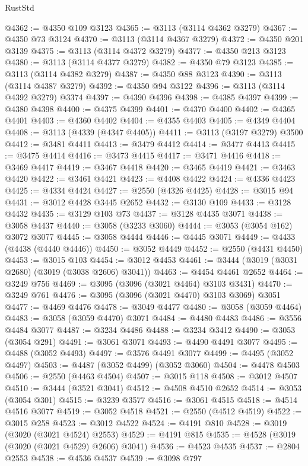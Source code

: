 \begin{lexlean}{RustStd}
\begin{coremodule}
@4362 := @4350 @109 @3123
@4365 := @3113 (@3114 @4362 @3279)
@4367 := @4350 @73 @3124
@4370 := @3113 (@3114 @4367 @3279)
@4372 := @4350 @201 @3139
@4375 := @3113 (@3114 @4372 @3279)
@4377 := @4350 @213 @3123
@4380 := @3113 (@3114 @4377 @3279)
@4382 := @4350 @79 @3123
@4385 := @3113 (@3114 @4382 @3279)
@4387 := @4350 @88 @3123
@4390 := @3113 (@3114 @4387 @3279)
@4392 := @4350 @94 @3122
@4396 := @3113 (@3114 @4392 @3279) @3374
@4397 := @4390 @4396
@4398 := @4385 @4397
@4399 := @4380 @4398
@4400 := @4375 @4399
@4401 := @4370 @4400
@4402 := @4365 @4401
@4403 := @4360 @4402
@4404 := @4355 @4403
@4405 := @4349 @4404
@4408 := @3113 (@4339 (@4347 @4405))
@4411 := @3113 (@3197 @3279) @3500
@4412 := @3481 @4411
@4413 := @3479 @4412
@4414 := @3477 @4413
@4415 := @3475 @4414
@4416 := @3473 @4415
@4417 := @3471 @4416
@4418 := @3469 @4417
@4419 := @3467 @4418
@4420 := @3465 @4419
@4421 := @3463 @4420
@4422 := @3461 @4421
@4423 := @4408 @4422
@4424 := @4336 @4423
@4425 := @4334 @4424
@4427 := @2550 (@4326 @4425)
@4428 := @3015 @94
@4431 := @3012 @4428 @3445 @2652
@4432 := @3130 @109
@4433 := @3128 @4432
@4435 := @3129 @103 @73
@4437 := @3128 @4435 @3071
@4438 := @3058 @4437
@4440 := @3058 (@3233 @3060)
@4444 := @3053 (@3054 @162) @3072 @3077
@4445 := @3058 @4444
@4446 := @4445 @3071
@4449 := @4433 (@4438 (@4440 @4446))
@4450 := @3052 @4449
@4452 := @2550 (@4431 @4450)
@4453 := @3015 @103
@4454 := @3012 @4453
@4461 := @3444 (@3019 (@3031 @2680) (@3019 (@3038 @2606) @3041))
@4463 := @4454 @4461 @2652
@4464 := @3249 @756
@4469 := @3095 (@3096 (@3021 @4464) @3103 @3431)
@4470 := @3249 @761
@4476 := @3095 (@3096 (@3021 @4470) @3103 @3069) @3051
@4477 := @4469 @4476
@4478 := @3049 @4477
@4480 := @3058 (@3059 @4464)
@4483 := @3058 (@3059 @4470) @3071
@4484 := @4480 @4483
@4486 := @3556 @4484 @3077
@4487 := @3234 @4486
@4488 := @3234 @3412
@4490 := @3053 (@3054 @291)
@4491 := @3061 @3071
@4493 := @4490 @4491 @3077
@4495 := @4488 (@3052 @4493)
@4497 := @3576 @4491 @3077
@4499 := @4495 (@3052 @4497)
@4503 := @4487 (@3052 @4499) (@3052 @3060)
@4504 := @4478 @4503
@4506 := @2550 (@4463 @4504)
@4507 := @3015 @118
@4508 := @3012 @4507
@4510 := @3444 (@3521 @3041)
@4512 := @4508 @4510 @2652
@4514 := @3053 (@3054 @301)
@4515 := @3239 @3577
@4516 := @3061 @4515
@4518 := @4514 @4516 @3077
@4519 := @3052 @4518
@4521 := @2550 (@4512 @4519)
@4522 := @3015 @258
@4523 := @3012 @4522
@4524 := @4191 @810
@4528 := @3019 (@3020 (@3021 @4524) @2553)
@4529 := @4191 @815
@4535 := @4528 (@3019 (@3020 (@3021 @4529) @2606) @3041)
@4536 := @4523 @4535
@4537 := @2804 @2553
@4538 := @4536 @4537
@4539 := @3098 @797

\end{coremodule}
\end{lexlean}

